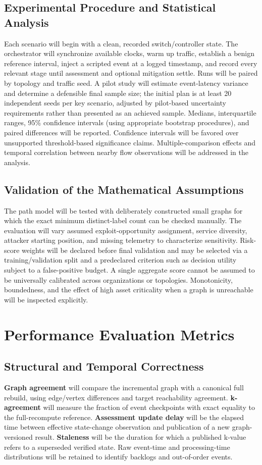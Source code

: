 \documentclass[12pt,a4paper,oneside]{article}
\begin{document}
\subsection{Experimental Procedure and Statistical Analysis}
Each scenario will begin with a clean, recorded switch/controller state. The orchestrator will synchronize available clocks, warm up traffic, establish a benign reference interval, inject a scripted event at a logged timestamp, and record every relevant stage until assessment and optional mitigation settle. Runs will be paired by topology and traffic seed. A pilot study will estimate event-latency variance and determine a defensible final sample size; the initial plan is at least 20 independent seeds per key scenario, adjusted by pilot-based uncertainty requirements rather than presented as an achieved sample. Medians, interquartile ranges, 95\% confidence intervals (using appropriate bootstrap procedures), and paired differences will be reported. Confidence intervals will be favored over unsupported threshold-based significance claims. Multiple-comparison effects and temporal correlation between nearby flow observations will be addressed in the analysis.

\subsection{Validation of the Mathematical Assumptions}
The path model will be tested with deliberately constructed small graphs for which the exact minimum distinct-label count can be checked manually. The evaluation will vary assumed exploit-opportunity assignment, service diversity, attacker starting position, and missing telemetry to characterize sensitivity. Risk-score weights will be declared before final validation and may be selected via a training/validation split and a predeclared criterion such as decision utility subject to a false-positive budget. A single aggregate score cannot be assumed to be universally calibrated across organizations or topologies. Monotonicity, boundedness, and the effect of high asset criticality when a graph is unreachable will be inspected explicitly.

\section{Performance Evaluation Metrics}\label{sec:metrics}
\subsection{Structural and Temporal Correctness}
\textbf{Graph agreement} will compare the incremental graph with a canonical full rebuild, using edge/vertex differences and target reachability agreement. \textbf{k-agreement} will measure the fraction of event checkpoints with exact equality to the full-recompute reference. \textbf{Assessment update delay} will be the elapsed time between effective state-change observation and publication of a new graph-versioned result. \textbf{Staleness} will be the duration for which a published k-value refers to a superseded verified state. Raw event-time and processing-time distributions will be retained to identify backlogs and out-of-order events.
\end{document}

